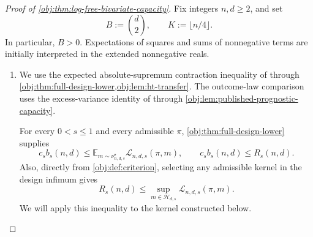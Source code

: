 \documentclass[11pt]{article}
\begin{document}
\begin{proof}[Proof of \cref{obj:thm:log-free-bivariate-capacity}]
Fix integers \(n,d\geq2\), and set
\[
B:=\binom d2,\qquad K:=\lfloor n/4\rfloor.
\]
In particular, \(B>0\). Expectations of squares and sums of nonnegative terms are initially interpreted in the extended nonnegative reals.

\begin{enumerate}
\item
We use the expected absolute-supremum contraction inequality of
\citep[Theorem 12(4), with the complexity convention of Definition 2]{BartlettMendelson2002Complexities}
through \cref{obj:thm:full-design-lower,obj:lem:ht-transfer}. The outcome-law comparison uses the excess-variance identity of
\citep[Proposition 2.3, equation (2.4), under Assumption 2.1 and Definition 2.2]{Cytrynbaum2026Limits}
through \cref{obj:lem:published-prognostic-capacity}.

For every \(0<s\leq1\) and every admissible \(\pi\), \cref{obj:thm:full-design-lower} supplies
\[
c_s b_s(n,d)
\leq
\mathbb E_{m\sim\nu^\star_{n,d,s}}
\mathcal L_{n,d,s}(\pi,m),
\qquad
c_s b_s(n,d)\leq R_s(n,d).
\]
Also, directly from \cref{obj:def:criterion}, selecting any admissible kernel in the design infimum gives
\[
R_s(n,d)
\leq
\sup_{m\in\mathcal H_{d,s}}\mathcal L_{n,d,s}(\pi,m).
\]
We will apply this inequality to the kernel constructed below.


\end{enumerate}
\end{proof}
\end{document}
